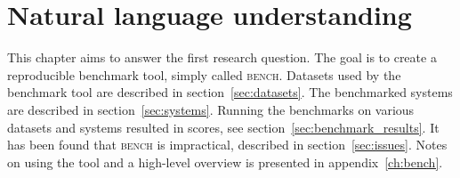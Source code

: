 \chapter{Natural language understanding}
\label{ch:nlu}

This chapter aims to answer the first research question.
The goal is to create a reproducible benchmark tool, simply called \textsc{bench}.
Datasets used by the benchmark tool are described in section~\ref{sec:datasets}.
The benchmarked systems are described in section~\ref{sec:systems}.
Running the benchmarks on various datasets and systems resulted in scores, see section~\ref{sec:benchmark_results}.
It has been found that \textsc{bench} is impractical, described in section~\ref{sec:issues}.
Notes on using the tool and a high-level overview is presented in appendix~\ref{ch:bench}.








